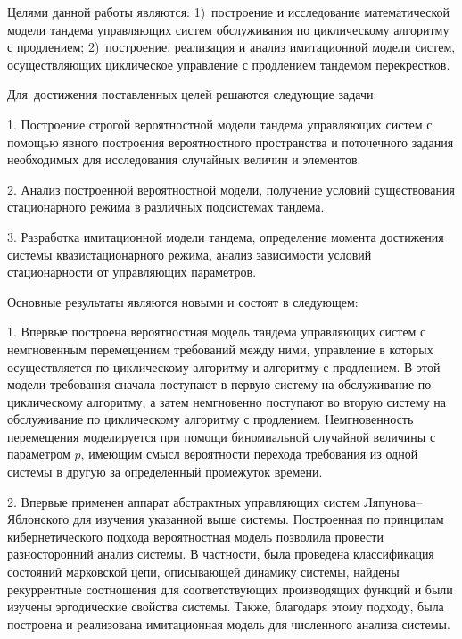 {\aim} Целями данной работы являются: 1)~построение и исследование математической модели тандема управляющих систем обслуживания по циклическому алгоритму с продлением; 2)~построение, реализация и анализ имитационной модели систем, осуществляющих циклическое управление с продлением тандемом перекрестков.

Для~достижения поставленных целей решаются следующие задачи:

1. Построение строгой вероятностной модели тандема управляющих систем с помощью явного построения вероятностного пространства и поточечного задания необходимых для исследования случайных величин и элементов.

2. Анализ построенной вероятностной модели, получение условий существования стационарного режима в различных подсистемах тандема.

3. Разработка имитационной модели тандема, определение момента достижения системы квазистационарного режима, анализ зависимости условий стационарности от управляющих параметров.



{\novelty} Основные результаты являются новыми и состоят в следующем:

1. Впервые построена вероятностная модель тандема управляющих систем с немгновенным перемещением требований между ними, управление в которых осуществляется по циклическому алгоритму и алгоритму с продлением. В этой модели требования сначала поступают в первую систему на обслуживание по циклическому алгоритму, а затем немгновенно поступают во вторую систему на обслуживание по циклическому алгоритму с продлением. Немгновенность перемещения моделируется при помощи биномиальной случайной величины с параметром $p$, имеющим смысл вероятности перехода требования из одной системы в другую за определенный промежуток времени.

2. Впервые применен аппарат абстрактных управляющих систем Ляпунова--Яблонского для изучения указанной выше системы. Построенная по принципам кибернетического подхода вероятностная модель позволила провести разносторонний анализ системы. В частности, была проведена классификация состояний марковской цепи, описывающей динамику системы, найдены рекуррентные соотношения для соответствующих производящих функций и были изучены эргодические свойства системы. Также, благодаря этому подходу, была построена и реализована имитационная модель для численного анализа системы.

